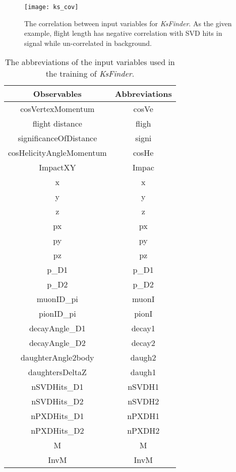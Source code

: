 \begin{figure}[ht]
\centering
\texttt{[image: ks\_cov]}
\caption{The correlation between input variables for \textit{KsFinder}. As the given example, flight length has negative correlation with SVD hits in signal while un-correlated in background.}
\label{fig:ks_cov}
\end{figure}

 \begin{table}[htpb]
 	\small
 	\begin{minipage}[ht]{1\linewidth}
 		\centering
 \caption{The abbreviations of the input variables used in the training of \textit{KsFinder}.}
  \label{tab:ks_abbv}
 		\begin{tabular}{c|c}
 			\hline
 			Observables &  Abbreviations\\
 			\hline
 			cosVertexMomentum & cosVe \\
 			flight distance & fligh\\
 			significanceOfDistance & signi \\
 			cosHelicityAngleMomentum & cosHe\\
 			 			ImpactXY & Impac \\
 			x & x \\
 			y & y \\
 			z & z \\
 			px & px\\
 			py & py\\
 				pz & pz \\
 					p\_D1 & p\_D1\\
 				p\_D2 & p\_D2\\
 				muonID\_pi & muonI\\
 			pionID\_pi & pionI\\
 			decayAngle\_D1 & decay1 \\
 			decayAngle\_D2 & decay2\\
 			daughterAngle2body & daugh2\\
 			daughtersDeltaZ & daugh1\\
 				nSVDHits\_D1 & nSVDH1\\
 				nSVDHits\_D2 & nSVDH2\\
 				nPXDHits\_D1 &  nPXDH1 \\
 				nPXDHits\_D2 &  nPXDH2 \\
 				M & M \\
 			InvM & InvM \\
 			\hline
 		\end{tabular}
 	\end{minipage}

 \end{table}

